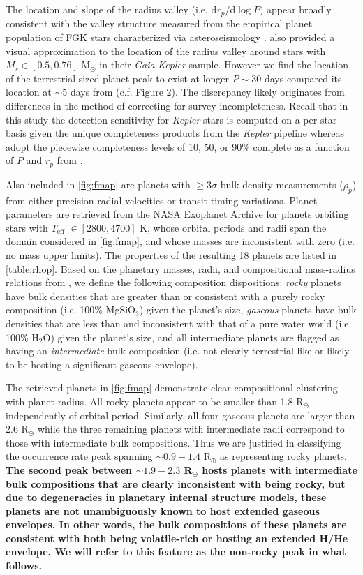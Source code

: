\documentclass[twocolumn]{emulateapj}
\newcommand{\gaia}[1]{\emph{Gaia}#1}
\newcommand{\kepler}[1]{\emph{Kepler}#1}
\newcommand{\teff}[1]{$T_{\text{eff}}$#1}
\begin{document}
The location and slope of the radius valley (i.e. $\text{d}r_p/\text{d}\log{P})$ appear broadly consistent
with the valley structure measured from the empirical planet population of FGK stars characterized via
asteroseismology \citep{vaneylen18}. \cite{wu19} also provided a visual approximation to the location of the
radius valley around stars with $M_s \in [0.5,0.76]$ M$_{\odot}$ in their \gaia{-}\kepler{} sample. However
we find the location of the terrestrial-sized planet peak to exist at longer $P \sim 30$ days compared its
location at $\sim 5$ days from \cite{wu19} (c.f. Figure 2). The discrepancy likely originates from differences
in the method of correcting for survey incompleteness.
Recall that in this study the detection sensitivity for \kepler{} stars is computed on a per star basis
given the unique completeness products from the \kepler{} pipeline whereas \cite{wu19} adopt the piecewise
completeness levels of 10, 50, or 90\% complete as a function of $P$ and $r_p$ from \cite{zhu18b}.

Also included in \autoref{fig:fmap} are planets
with $\geq 3\sigma$ bulk density measurements ($\rho_p$) from either precision radial velocities or
transit timing variations.
Planet parameters are retrieved from the NASA Exoplanet Archive for planets orbiting stars with
\teff{} $\in[2800,4700]$ K, whose orbital periods and radii span the domain considered in \autoref{fig:fmap},
and whose masses are inconsistent with zero (i.e. no mass upper limits).
The properties of the resulting 18 planets are listed in \autoref{table:rhop}. Based on the
planetary masses, radii, and compositional mass-radius relations from \cite{zeng13},
we define the following composition dispositions: \emph{rocky}
planets have bulk densities that are greater than or consistent with a purely rocky composition
(i.e. 100\% MgSiO$_3$) given the planet's size, \emph{gaseous} planets have bulk densities that are less
than and inconsistent with that of a pure water world (i.e. 100\% H$_2$O) given the planet's size, 
and all intermediate planets are flagged as having an \emph{intermediate} bulk composition (i.e. not clearly
terrestrial-like or likely to be hosting a significant gaseous envelope).



The retrieved planets in \autoref{fig:fmap} demonstrate clear compositional clustering with planet radius.
All rocky planets appear to be smaller than 1.8 R$_{\oplus}$ independently of orbital period.
Similarly, all four gaseous planets are larger than 2.6 R$_{\oplus}$ while the three remaining planets
with intermediate radii correspond to those with intermediate bulk compositions. 
Thus we are justified in classifying the occurrence rate peak spanning $\sim 0.9-1.4$ R$_{\oplus}$
as representing rocky planets. \textbf{The second peak between $\sim 1.9-2.3$ R$_{\oplus}$ hosts
planets with intermediate bulk compositions that are clearly inconsistent with being rocky, but due to
degeneracies in planetary internal structure models, these planets are not unambiguously known
to host extended gaseous envelopes. In other words, the bulk compositions of these planets
are consistent with both being volatile-rich or hosting an extended H/He envelope. 
We will refer to this feature as the non-rocky peak in what follows.}
\end{document}
